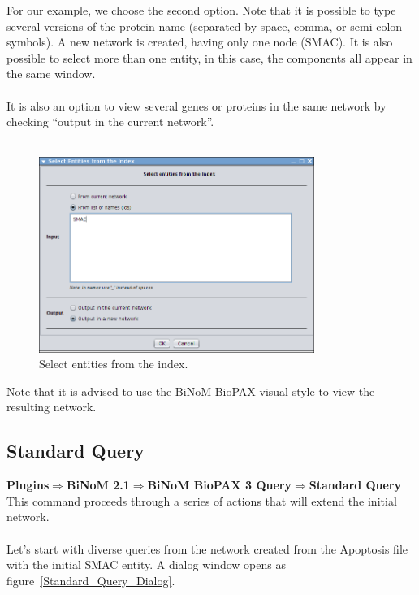For our example, we choose the second option. Note that it is possible to type
several versions of the protein name (separated by space, comma, or semi-colon
symbols). A new network is created, having only one node (SMAC). It is also
possible to select more than one entity, in this case, the components all appear
in the same window.\\\\

It is also an option to view several genes or proteins in the same network by
checking “output in the current network”.\\\\

\begin{figure}
\centering
\includegraphics[width=0.8\textwidth]{graphics/ebo_select_entities_from_the_index}
\caption{Select entities from the index.}
\label{Select_entities_from_index}
\end{figure}

Note that it is advised to use the BiNoM BioPAX visual style to view the resulting network.

\subsection{Standard Query}
\textbf{Plugins$\Rightarrow$BiNoM 2.1$\Rightarrow$BiNoM BioPAX 3 Query$\Rightarrow$Standard Query}\\

This command proceeds through a series of actions that will extend the initial
network.\\\\
Let’s start with diverse queries from the network created from the Apoptosis
file with the initial SMAC entity. A dialog window opens as
figure~\ref{Standard_Query_Dialog}.\\\\

